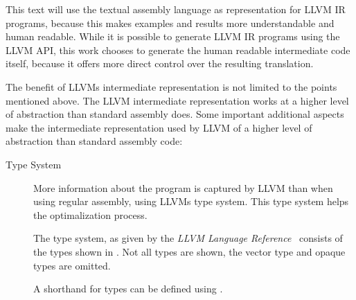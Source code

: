 This text will use the textual assembly language as representation for LLVM IR programs, because this makes examples and results more understandable and human readable.
While it is possible to generate LLVM IR programs using the LLVM API, this work chooses to generate the human readable intermediate code itself, because it offers more direct control over the resulting translation.

The benefit of LLVMs intermediate representation is not limited to the points mentioned above.
The LLVM intermediate representation works at a higher level of abstraction than standard assembly does.
Some important additional aspects make the intermediate representation used by LLVM of a higher level of abstraction than standard assembly code:

\begin{description}
\item[Type System] More information about the program is captured by LLVM than when using regular assembly, using LLVMs type system.
This type system helps the optimalization process.

The type system, as given by the \emph{LLVM Language Reference}~\cite{LLVMFAQ} consists of the types shown in . Not all types are shown, the vector type and opaque types are omitted.

A shorthand for types can be defined using .


\end{description}
